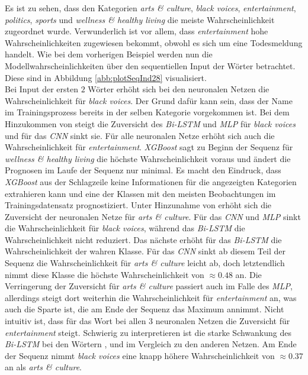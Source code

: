 \documentclass[a4paper,11pt]{article}
\begin{document}
Es ist zu sehen, dass den Kategorien \textit{arts \& culture}, \textit{black voices}, \textit{entertainment}, \textit{politics}, \textit{sports} und \textit{wellness \& healthy living} die meiste Wahrscheinlichkeit zugeordnet wurde. Verwunderlich ist vor allem, dass \textit{entertainment} hohe Wahrscheinlichkeiten zugewiesen bekommt, obwohl es sich um eine Todesmeldung handelt. Wie bei dem vorherigen Beispiel werden nun die Modellwahrscheinlichkeiten über den sequentiellen Input der Wörter betrachtet. Diese sind in Abbildung \ref{abb:plotSeqInd28} visualisiert.\\
Bei Input der ersten $2$ Wörter  erhöht sich bei den neuronalen Netzen die Wahrscheinlichkeit für \textit{black voices}. Der Grund dafür kann sein, dass der Name im Trainingsprozess bereits in der selben Kategorie vorgekommen ist. Bei dem Hinzukommen von  steigt die Zuversicht des \textit{Bi-LSTM} und \textit{MLP} für \textit{black voices} und für das \textit{CNN} sinkt sie. Für alle neuronalen Netze erhöht sich auch die Wahrscheinlichkeit für \textit{entertainment}. \textit{XGBoost} sagt zu Beginn der Sequenz für \textit{wellness \& healthy living} die höchste Wahrscheinlichkeit voraus und ändert die Prognosen im Laufe der Sequenz nur minimal. Es macht den Eindruck, dass \textit{XGBoost} aus der Schlagzeile keine Informationen für die angezeigten Kategorien extrahieren kann und eine der Klassen mit den meisten Beobachtungen im Trainingsdatensatz prognostiziert. Unter Hinzunahme von  erhöht sich die Zuversicht der neuronalen Netze für \textit{arts \& culture}. Für das \textit{CNN} und \textit{MLP} sinkt die Wahrscheinlichkeit für \textit{black voices}, während das \textit{Bi-LSTM} die Wahrscheinlichkeit nicht reduziert. Das nächste \say{\textit{,}} erhöht für das \textit{Bi-LSTM} die Wahrscheinlichkeit der wahren Klasse. Für das \textit{CNN} sinkt ab diesem Teil der Sequenz die Wahrscheinlichkeit für \textit{arts \& culture} leicht ab, doch letztendlich nimmt diese Klasse die höchste Wahrscheinlichkeit von $\approx 0.48$ an. Die Verringerung der Zuversicht für \textit{arts \& culture} passiert auch im Falle des \textit{MLP}, allerdings steigt dort weiterhin die Wahrscheinlichkeit für \textit{entertainment} an, was auch die Sparte ist, die am Ende der Sequenz das Maximum annimmt. Nicht intuitiv ist, dass für das Wort  bei allen $3$ neuronalen Netzen die Zuversicht für \textit{entertainment} steigt. Schwierig zu interpretieren ist die starke Schwankung des \textit{Bi-LSTM} bei den Wörtern ,  und  im Vergleich zu den anderen Netzen. Am Ende der Sequenz nimmt \textit{black voices} eine knapp höhere Wahrscheinlichkeit von $\approx 0.37$ an als \textit{arts \& culture}.\\
\end{document}
